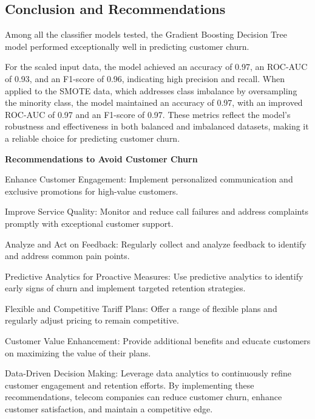 \documentclass[11pt]{article}
\makeatletter
\newcommand{\boxspacing}{\kern\kvtcb@left@rule\kern\kvtcb@boxsep}
\newcommand{\prompt}[4]{
        {\ttfamily\llap{{\color{#2}[#3]:\hspace{3pt}#4}}\vspace{-\baselineskip}}
    }
\makeatother
\begin{document}
    \subsection{Conclusion and
Recommendations}\label{conclusion-and-recommendations}

    Among all the classifier models tested, the Gradient Boosting Decision
Tree model performed exceptionally well in predicting customer churn.

For the scaled input data, the model achieved an accuracy of 0.97, an
ROC-AUC of 0.93, and an F1-score of 0.96, indicating high precision and
recall. When applied to the SMOTE data, which addresses class imbalance
by oversampling the minority class, the model maintained an accuracy of
0.97, with an improved ROC-AUC of 0.97 and an F1-score of 0.97. These
metrics reflect the model's robustness and effectiveness in both
balanced and imbalanced datasets, making it a reliable choice for
predicting customer churn.

\textbf{Recommendations to Avoid Customer Churn}

Enhance Customer Engagement: Implement personalized communication and
exclusive promotions for high-value customers.

Improve Service Quality: Monitor and reduce call failures and address
complaints promptly with exceptional customer support.

Analyze and Act on Feedback: Regularly collect and analyze feedback to
identify and address common pain points.

Predictive Analytics for Proactive Measures: Use predictive analytics to
identify early signs of churn and implement targeted retention
strategies.

Flexible and Competitive Tariff Plans: Offer a range of flexible plans
and regularly adjust pricing to remain competitive.

Customer Value Enhancement: Provide additional benefits and educate
customers on maximizing the value of their plans.

Data-Driven Decision Making: Leverage data analytics to continuously
refine customer engagement and retention efforts. By implementing these
recommendations, telecom companies can reduce customer churn, enhance
customer satisfaction, and maintain a competitive edge.

    \begin{tcolorbox}[breakable, size=fbox, boxrule=1pt, pad at break*=1mm,colback=cellbackground, colframe=cellborder]
\prompt{In}{incolor}{ }{\boxspacing}
\begin{Verbatim}[commandchars=\\\{\}]

\end{Verbatim}
\end{tcolorbox}


    
    
    
\end{document}

